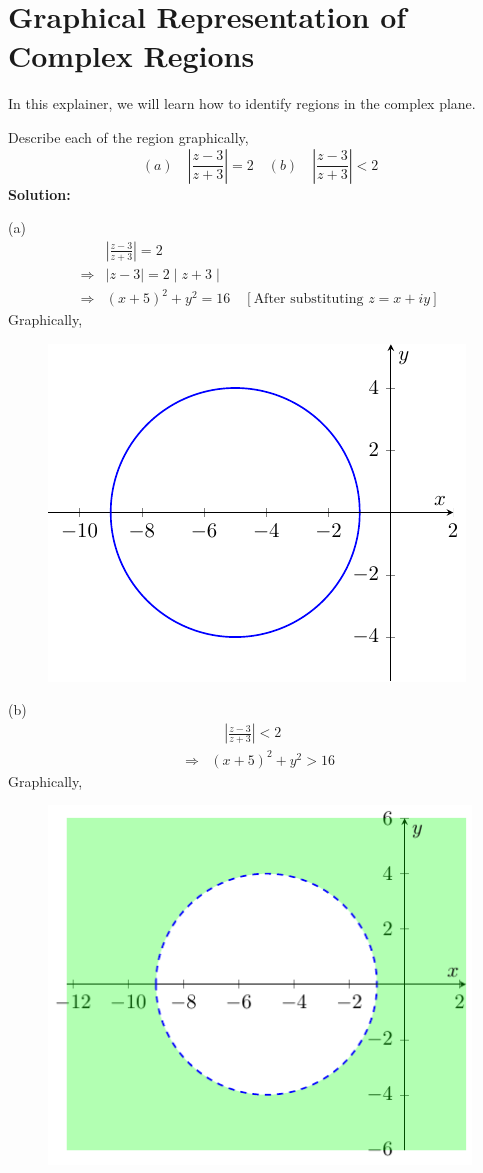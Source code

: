 \section{Graphical Representation of Complex Regions}
In this explainer, we will learn how to identify regions in the complex plane.
\begin{ex}
    Describe each of the region graphically, 
    $$(a) \quad \left|\frac{z-3}{z+3} \right|=2 \quad (b) \quad \left|\frac{z-3}{z+3} \right|<2$$
    \noindent \textbf{Solution:}\par 
    \noindent (a) \begin{align*}
        & \left|\frac{z-3}{z+3} \right|=2 \quad \\
        \Rightarrow & \mid z-3 \mid =2\mid z+3 \mid \\
        \Rightarrow & (x+5)^2+y^2=16 \quad [\text{After substituting } z=x+iy]
    \end{align*}
    Graphically, \begin{figure}[ht!]
        \centering
        \includegraphics{FIG_MAT215/FIG9.pdf}
        \label{fig 9}
    \end{figure}
    \FloatBarrier
    (b) \begin{align*}
        &  \quad \left|\frac{z-3}{z+3} \right| < 2\\
        \Rightarrow & (x+5)^2+y^2>16
    \end{align*}
    Graphically, \begin{figure}[ht!]
        \centering
        \includegraphics{FIG_MAT215/FIG10.pdf}

\end{figure}
\end{ex}
